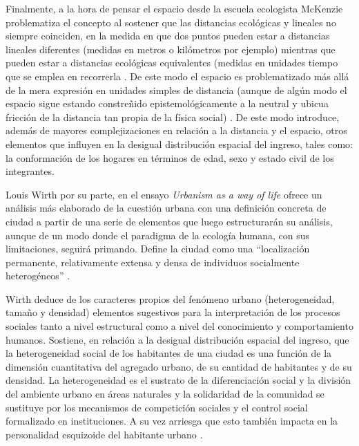 Finalmente, a la hora de pensar el espacio desde la escuela ecologista McKenzie  problematiza el concepto al sostener que las distancias ecológicas y lineales no siempre coinciden, en la medida en que dos puntos pueden estar a distancias lineales diferentes (medidas en metros o kilómetros por ejemplo) mientras que pueden estar a distancias ecológicas equivalentes (medidas en unidades tiempo que se emplea en recorrerla \cite{betin,mckenzie}. De este modo el espacio es problematizado más allá de la mera expresión en unidades simples de distancia (aunque de algún modo el espacio sigue estando constreñido epistemológicamente a la neutral y ubicua fricción de la distancia tan propia de la física social) \cite{soja}. De este modo introduce, además de mayores complejizaciones en relación a la distancia y el espacio, otros elementos que influyen en la desigual distribución espacial del ingreso, tales como: la conformación de los hogares en términos de edad, sexo y estado civil de los integrantes.

Louis Wirth \citeyear{wirth} por su parte, en el ensayo \textit{Urbanism as a way of life} ofrece un análisis más elaborado de la cuestión urbana con una definición concreta de ciudad a partir de una serie de elementos que luego estructurarán su análisis, aunque de un modo donde el paradigma de la ecología humana, con sus limitaciones, seguirá primando. Define la ciudad como una “localización permanente, relativamente extensa y densa de individuos socialmente heterogéneos” \cite[p.~8]{wirth}. 

Wirth deduce de los caracteres propios del fenómeno urbano (heterogeneidad, tamaño y densidad) elementos sugestivos para la interpretación de los procesos sociales tanto a nivel estructural como a nivel del conocimiento y comportamiento humanos. Sostiene, en relación a la desigual distribución espacial del ingreso, que la heterogeneidad social de los habitantes de una ciudad es una función de la dimensión cuantitativa del agregado urbano, de su cantidad de habitantes y de su densidad. La heterogeneidad es el sustrato de la diferenciación social y la división del ambiente urbano en áreas naturales y la solidaridad de la comunidad se sustituye por los mecanismos de competición sociales y el control social formalizado en instituciones. A su vez arriesga que esto también impacta en la personalidad esquizoide del habitante urbano \cite{betin,castells}.

